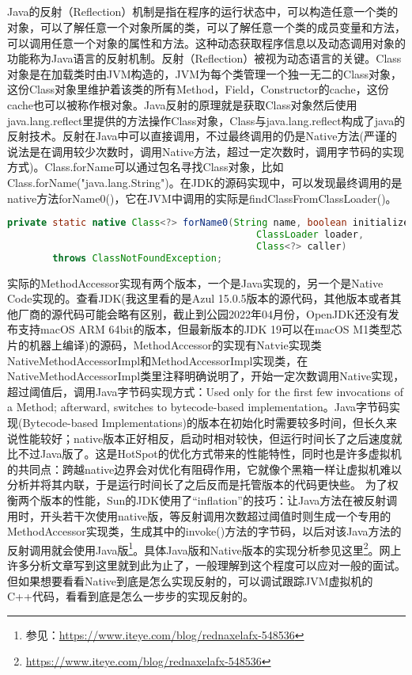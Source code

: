 \documentclass[../../../interview-questions.tex]{subfiles}
\begin{document}
\subsection{\color{red}{Java反射的实现原理}}

Java的反射（Reflection）机制是指在程序的运行状态中，可以构造任意一个类的对象，可以了解任意一个对象所属的类，可以了解任意一个类的成员变量和方法，可以调用任意一个对象的属性和方法。这种动态获取程序信息以及动态调用对象的功能称为Java语言的反射机制。反射（Reflection）被视为动态语言的关键。Class对象是在加载类时由JVM构造的，JVM为每个类管理一个独一无二的Class对象，这份Class对象里维护着该类的所有Method，Field，Constructor的cache，这份cache也可以被称作根对象。Java反射的原理就是获取Class对象然后使用java.lang.reflect里提供的方法操作Class对象，Class与java.lang.reflect构成了java的反射技术。反射在Java中可以直接调用，不过最终调用的仍是Native方法(严谨的说法是在调用较少次数时，调用Native方法，超过一定次数时，调用字节码的实现方式)。Class.forName可以通过包名寻找Class对象，比如Class.forName("java.lang.String")。在JDK的源码实现中，可以发现最终调用的是native方法forName0()，它在JVM中调用的实际是findClassFromClassLoader()。

\begin{lstlisting}[language=Java]
private static native Class<?> forName0(String name, boolean initialize,
                                            ClassLoader loader,
                                            Class<?> caller)
        throws ClassNotFoundException;
\end{lstlisting}

实际的MethodAccessor实现有两个版本，一个是Java实现的，另一个是Native Code实现的。查看JDK(我这里看的是Azul 15.0.5版本的源代码，其他版本或者其他厂商的源代码可能会略有区别，截止到公园2022年04月份，OpenJDK还没有发布支持macOS ARM 64bit的版本，但最新版本的JDK 19可以在macOS M1类型芯片的机器上编译)的源码，MethodAccessor的实现有Natvie实现类NativeMethodAccessorImpl和MethodAccessorImpl实现类，在NativeMethodAccessorImpl类里注释明确说明了，开始一定次数调用Native实现，超过阈值后，调用Java字节码实现方式：Used only for the first few invocations of a Method; afterward, switches to bytecode-based implementation。Java字节码实现(Bytecode-based Implementations)的版本在初始化时需要较多时间，但长久来说性能较好；native版本正好相反，启动时相对较快，但运行时间长了之后速度就比不过Java版了。这是HotSpot的优化方式带来的性能特性，同时也是许多虚拟机的共同点：跨越native边界会对优化有阻碍作用，它就像个黑箱一样让虚拟机难以分析并将其内联，于是运行时间长了之后反而是托管版本的代码更快些。
为了权衡两个版本的性能，Sun的JDK使用了“inflation”的技巧：让Java方法在被反射调用时，开头若干次使用native版，等反射调用次数超过阈值时则生成一个专用的MethodAccessor实现类，生成其中的invoke()方法的字节码，以后对该Java方法的反射调用就会使用Java版\footnote{参见：\url{https://www.iteye.com/blog/rednaxelafx-548536}}。具体Java版和Native版本的实现分析参见这里\footnote{\url{https://www.iteye.com/blog/rednaxelafx-548536}}。网上许多分析文章写到这里就到此为止了，一般理解到这个程度可以应对一般的面试。但如果想要看看Native到底是怎么实现反射的，可以调试跟踪JVM虚拟机的C++代码，看看到底是怎么一步步的实现反射的。
\end{document}
